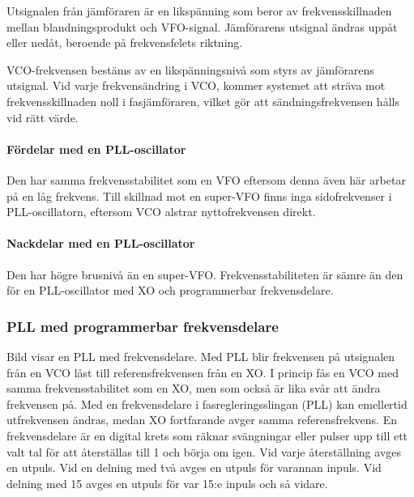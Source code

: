 Utsignalen från jämföraren är en likspänning som beror av frekvensskillnaden
mellan blandningsprodukt och VFO-signal.
Jämförarens utsignal ändras uppåt eller nedåt, beroende på frekvensfelets
riktning.

VCO-frekvensen bestäms av en likspänningsnivå som styrs av jämförarens
utsignal.
Vid varje frekvensändring i VCO, kommer systemet att sträva mot
frekvensskillnaden noll i fasjämföraren, vilket gör att sändningsfrekvensen
hålls vid rätt värde.

\paragraph{Fördelar med en PLL-oscillator}
Den har samma frekvensstabilitet som en VFO eftersom denna även här arbetar på
en låg frekvens.
Till skillnad mot en super-VFO finns inga sidofrekvenser i PLL-oscillatorn,
eftersom VCO alstrar nyttofrekvensen direkt.

\paragraph{Nackdelar med en PLL-oscillator}
Den har högre brusnivå än en super-VFO.
Frekvensstabiliteten är sämre än den för en PLL-oscillator med XO och
programmerbar frekvensdelare.

\subsubsection{PLL med programmerbar frekvensdelare}


Bild  visar en PLL med frekvensdelare.
Med PLL blir frekvensen på utsignalen från en VCO låst till referensfrekvensen
från en XO.
I princip fås en VCO med samma frekvensstabilitet som en XO, men som också är
lika svår att ändra frekvensen på.
Med en frekvensdelare i fasregleringsslingan (PLL) kan emellertid utfrekvensen
ändras, medan XO fortfarande avger samma referensfrekvens.
En frekvensdelare är en digital krets som räknar svängningar eller pulser upp
till ett valt tal för att återställas till 1 och börja om igen.
Vid varje återställning avges en utpuls.
Vid en delning med två avges en utpuls för varannan inpuls.
Vid delning med 15 avges en utpuls för var 15:e inpuls och så vidare.

